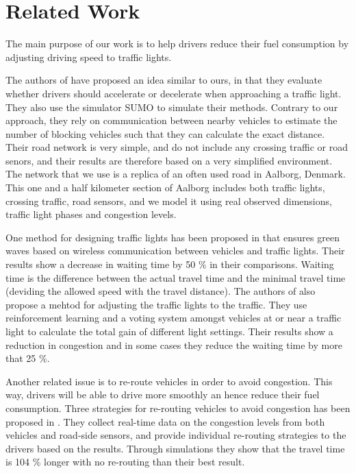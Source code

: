 \section{Related Work}\label{sec:RelatedWork}

The main purpose of our work is to help drivers reduce their fuel consumption by adjusting driving speed to traffic lights.


The authors of \cite{VANETsim} have proposed an idea similar to ours, in that they evaluate whether drivers should accelerate or decelerate when approaching a traffic light.
They also use the simulator SUMO to simulate their methods. 
Contrary to our approach, they rely on communication between nearby vehicles to estimate the number of blocking vehicles such that they can calculate the exact distance.
Their road network is very simple, and do not include any crossing traffic or road senors, and their results are therefore based on a very simplified environment. 
The network that we use is a replica of an often used road in Aalborg, Denmark. 
This one and a half kilometer section of Aalborg includes both traffic lights, crossing traffic, road sensors, and we model it using real observed dimensions, traffic light phases and congestion levels.

One method for designing traffic lights has been proposed in \cite{SOTL} that ensures green waves based on wireless communication between vehicles and traffic lights. 
Their results show a decrease in waiting time by 50 \% in their comparisons. 
Waiting time is the difference between the actual travel time and the minimal travel time (deviding the allowed speed with the travel distance).
The authors of \cite{ITLC} also propose a mehtod for adjusting the traffic lights to the traffic. 
They use reinforcement learning and a voting system amongst vehicles at or near a traffic light to calculate the total gain of different light settings. 
Their results show a reduction in congestion and in some cases they reduce the waiting time by more that 25 \%.

Another related issue is to re-route vehicles in order to avoid congestion. 
This way, drivers will be able to drive more smoothly an hence reduce their fuel consumption. 
Three strategies for re-routing vehicles to avoid congestion has been proposed in \cite{congestionAvoidance}. 
They collect real-time data on the congestion levels from both vehicles and road-side sensors, and provide individual re-routing strategies to the drivers based on the results. 
Through simulations they show that the travel time is 104 \% longer with no re-routing than their best result.

